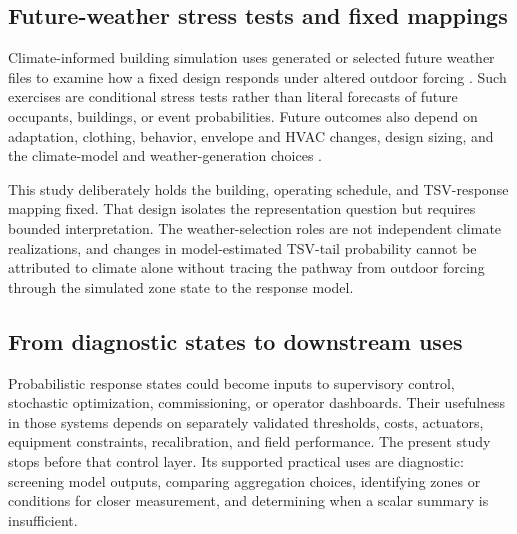 \subsection{Future-weather stress tests and fixed mappings}

Climate-informed building simulation uses generated or selected future weather files to examine how a fixed design responds under altered outdoor forcing \citep{GuoHe2026sAMY,GuoHe2026InputQuality}. Such exercises are conditional stress tests rather than literal forecasts of future occupants, buildings, or event probabilities. Future outcomes also depend on adaptation, clothing, behavior, envelope and HVAC changes, design sizing, and the climate-model and weather-generation choices \citep{Chaer2026OverheatingFramework,Ozarisoy2026ClimateResponsiveEnvelope}.

This study deliberately holds the building, operating schedule, and TSV-response mapping fixed. That design isolates the representation question but requires bounded interpretation. The weather-selection roles are not independent climate realizations, and changes in model-estimated TSV-tail probability cannot be attributed to climate alone without tracing the pathway from outdoor forcing through the simulated zone state to the response model.

\subsection{From diagnostic states to downstream uses}

Probabilistic response states could become inputs to supervisory control, stochastic optimization, commissioning, or operator dashboards. Their usefulness in those systems depends on separately validated thresholds, costs, actuators, equipment constraints, recalibration, and field performance. The present study stops before that control layer. Its supported practical uses are diagnostic: screening model outputs, comparing aggregation choices, identifying zones or conditions for closer measurement, and determining when a scalar summary is insufficient.
